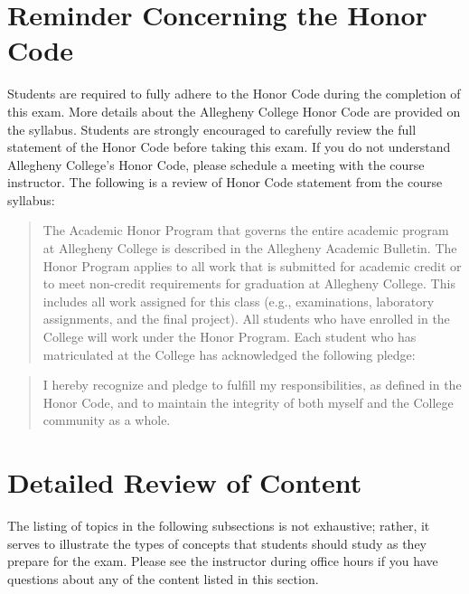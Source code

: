 \documentclass[11pt]{article}
\begin{document}
\section*{Reminder Concerning the Honor Code}

\noindent Students are required to fully adhere to the Honor Code during the
completion of this exam. More details about the Allegheny College Honor Code are
provided on the syllabus. Students are strongly encouraged to carefully review
the full statement of the Honor Code before taking this exam. If you do not
understand Allegheny College's Honor Code, please schedule a meeting with the
course instructor. The following is a review of Honor Code statement from the
course syllabus:

\vspace*{-.05in}

\begin{quote}
The Academic Honor Program that governs the entire academic program at
Allegheny College is described in the Allegheny Academic Bulletin. The Honor
Program applies to all work that is submitted for academic credit or to meet
non-credit requirements for graduation at Allegheny College. This includes all
work assigned for this class (e.g., examinations, laboratory assignments, and
the final project). All students who have enrolled in the College will work
under the Honor Program.  Each student who has matriculated at the College has
acknowledged the following pledge:
\end{quote}

\vspace*{-.1in}

\begin{quote}
  I hereby recognize and pledge to fulfill my responsibilities, as defined in the Honor Code, and to maintain the
  integrity of both myself and the College community as a whole.
\end{quote}

\section*{Detailed Review of Content}

The listing of topics in the following subsections is not exhaustive; rather, it
serves to illustrate the types of concepts that students should study as they
prepare for the exam. Please see the instructor during office hours if you have
questions about any of the content listed in this section.

\vspace*{-.1in}
\end{document}
